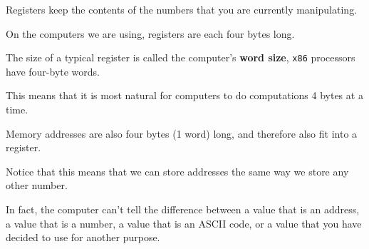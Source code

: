\documentclass{article}
\newcommand {\code}{\texttt}
\begin{document}
	Registers keep the contents of the numbers that you are currently manipulating.
	
	On the computers we are using, registers are each four bytes long.
	
	The size of a typical register is called the computer's \textbf {word size},
	\code {x86} processors have four-byte words.
	
	This means that it is most natural for computers to do computations 4 bytes at a time.
	
	Memory addresses are also four bytes (1 word) long, and therefore also fit into
	a register.
	
	Notice that this means that we can store addresses the same way we store any other
	number.
	
	In fact, the computer can't tell the difference between a value that is an address,
	a value that is a number, a value that is an ASCII code, or a value that you have
	decided to use for another purpose.
	
\end{document}

